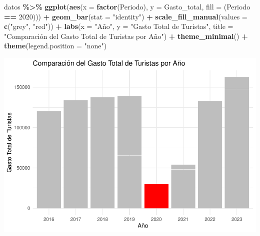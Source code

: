 \documentclass[data,article,submit,moreauthors,pdftex]{Definitions/mdpi}
\newenvironment{Shaded}{\begin{snugshade}}{\end{snugshade}}
\newcommand{\AttributeTok}[1]{\textcolor[rgb]{0.13,0.29,0.53}{#1}}
\newcommand{\DecValTok}[1]{\textcolor[rgb]{0.00,0.00,0.81}{#1}}
\newcommand{\FunctionTok}[1]{\textcolor[rgb]{0.13,0.29,0.53}{\textbf{#1}}}
\newcommand{\NormalTok}[1]{#1}
\newcommand{\SpecialCharTok}[1]{\textcolor[rgb]{0.81,0.36,0.00}{\textbf{#1}}}
\newcommand{\StringTok}[1]{\textcolor[rgb]{0.31,0.60,0.02}{#1}}
\begin{document}
\begin{Shaded}
\begin{Highlighting}[]
\NormalTok{datos }\SpecialCharTok{\%\textgreater{}\%}
    \FunctionTok{ggplot}\NormalTok{(}\FunctionTok{aes}\NormalTok{(}\AttributeTok{x =} \FunctionTok{factor}\NormalTok{(Periodo), }\AttributeTok{y =}\NormalTok{ Gasto\_total, }\AttributeTok{fill =}\NormalTok{ (Periodo }\SpecialCharTok{==}
        \DecValTok{2020}\NormalTok{))) }\SpecialCharTok{+} \FunctionTok{geom\_bar}\NormalTok{(}\AttributeTok{stat =} \StringTok{"identity"}\NormalTok{) }\SpecialCharTok{+} \FunctionTok{scale\_fill\_manual}\NormalTok{(}\AttributeTok{values =} \FunctionTok{c}\NormalTok{(}\StringTok{"grey"}\NormalTok{,}
    \StringTok{"red"}\NormalTok{)) }\SpecialCharTok{+} \FunctionTok{labs}\NormalTok{(}\AttributeTok{x =} \StringTok{"Año"}\NormalTok{, }\AttributeTok{y =} \StringTok{"Gasto Total de Turistas"}\NormalTok{,}
    \AttributeTok{title =} \StringTok{"Comparación del Gasto Total de Turistas por Año"}\NormalTok{) }\SpecialCharTok{+}
    \FunctionTok{theme\_minimal}\NormalTok{() }\SpecialCharTok{+} \FunctionTok{theme}\NormalTok{(}\AttributeTok{legend.position =} \StringTok{"none"}\NormalTok{)}
\end{Highlighting}
\end{Shaded}

\includegraphics{ProyectoAED2024_Rmd_files/figure-latex/unnamed-chunk-23-1.pdf}
\end{document}
